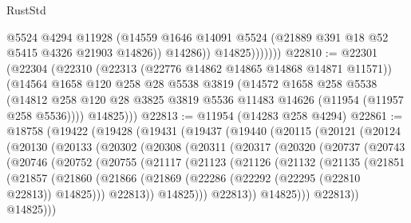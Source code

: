 \begin{lexlean}{RustStd}
\begin{coremodule}
                      @5524
                      @4294
                      @11928
                      (@14559 @1646 @14091 @5524 (@21889 @391 @18 @52 @5415 @4326 @21903 @14826))
                      @14286))
                  @14825)))))))
@22810 := @22301
    (@22304
      (@22310
        (@22313 (@22776 @14862 @14865 @14868 @14871 @11571))
        (@14564
          @1658
          @120
          @258
          @28
          @5538
          @3819
          (@14572
            @1658
            @258
            @5538
            (@14812 @258 @120 @28 @3825 @3819 @5536 @11483 @14626 (@11954 (@11957 @258 @5536))))
          @14825)))
@22813 := @11954 (@14283 @258 @4294)
@22861 := @18758
    (@19422
      (@19428
        (@19431
          (@19437
            (@19440
              (@20115
                (@20121
                  (@20124
                    (@20130
                      (@20133
                        (@20302
                          (@20308
                            (@20311
                              (@20317
                                (@20320
                                  (@20737
                                    (@20743
                                      (@20746
                                        (@20752
                                          (@20755
                                            (@21117
                                              (@21123
                                                (@21126
                                                  (@21132
                                                    (@21135
                                                      (@21851
                                                        (@21857
                                                          (@21860
                                                            (@21866
                                                              (@21869
                                                                (@22286
                                                                  (@22292
                                                                    (@22295 (@22810 @22813))
                                                                    @14825)))
                                                              @22813))
                                                          @14825)))
                                                    @22813))
                                                @14825)))
                                          @22813))
                                      @14825)))

\end{coremodule}
\end{lexlean}
